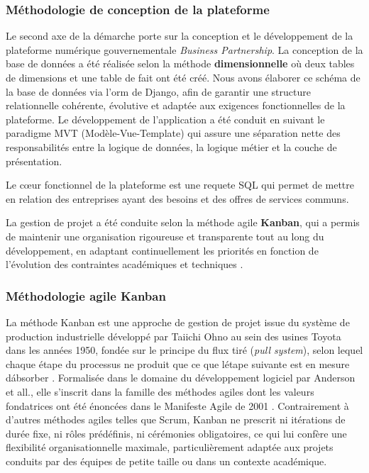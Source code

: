 \documentclass[12pt, a4paper, oneside]{report}
\begin{document}
	\subsubsection{Méthodologie de conception de la plateforme}
	Le second axe de la démarche porte sur la conception et le
	développement de la plateforme numérique gouvernementale
	\textit{Business Partnership}. La conception de la base de données
	a été réalisée selon la méthode \textbf{dimensionnelle} où deux tables de dimensions et une table de fait ont été créé. Nous avons élaborer
	ce schéma de la base de données via l'\gls{orm} de Django, afin de garantir une structure relationnelle
	cohérente, évolutive et adaptée aux exigences fonctionnelles
	de la plateforme. Le développement de
	l'application a été conduit en suivant le paradigme MVT
	(Modèle-Vue-Template) qui assure une séparation nette des
	responsabilités entre la logique de données, la logique métier
	et la couche de présentation.
	
	Le c\oe ur fonctionnel 
	de la plateforme est une requete SQL qui permet de mettre en relation des entreprises ayant des besoins et des offres de services communs. 
	
	  La gestion de projet a été conduite selon la méthode
	agile \textbf{Kanban}, qui a permis de maintenir une organisation
	rigoureuse et transparente tout au long du développement, en
	adaptant continuellement les priorités en fonction de l'évolution
	des contraintes académiques et techniques \citep{anderson_2010}.
	\subsubsection{M\'ethodologie agile Kanban}
	
	La m\'ethode Kanban est une approche de gestion de projet
	issue du syst\`eme de production industrielle d\'evelopp\'e
	par Taiichi Ohno au sein des usines Toyota dans les ann\'ees
	1950, fond\'ee sur le principe du flux tir\'e
	(\textit{pull system}), selon lequel chaque \'etape du
	processus ne produit que ce que l\'etape suivante est en
	mesure d\'absorber \cite{ohno_1988}. Formalis\'ee dans le
	domaine du d\'eveloppement logiciel par Anderson et all.\cite{anderson_2010},
	elle s'inscrit dans la famille des m\'ethodes agiles dont
	les valeurs fondatrices ont \'et\'e \'enonc\'ees dans le
	Manifeste Agile de 2001 \cite{beck2001}. Contrairement \`a
	d'autres m\'ethodes agiles telles que Scrum, Kanban ne
	prescrit ni it\'erations de dur\'ee fixe, ni r\^oles
	pr\'ed\'efinis, ni c\'er\'emonies obligatoires, ce qui lui
	conf\`ere une flexibilit\'e organisationnelle maximale,
	particuli\`erement adapt\'ee aux projets conduits par des
	\'equipes de petite taille ou dans un contexte acad\'emique.
	
\end{document}
